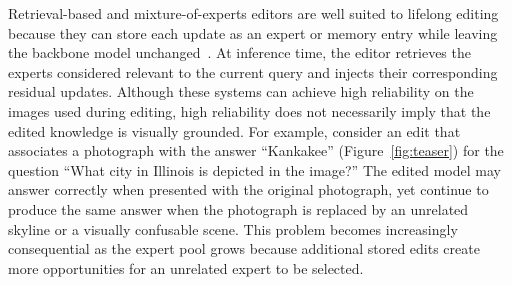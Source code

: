 \documentclass[letterpaper]{article} %
\begin{document}

Retrieval-based and mixture-of-experts editors are well suited to lifelong editing because they can store each update as an expert or memory entry while leaving the backbone model unchanged~\citep{mitchell2022serac,chen2025liveedit}. At inference time, the editor retrieves the experts considered relevant to the current query and injects their corresponding residual updates. Although these systems can achieve high reliability on the images used during editing, high reliability does not necessarily imply that the edited knowledge is visually grounded. For example, consider an edit that associates a photograph with the answer ``Kankakee'' (Figure~\ref{fig:teaser}) for the question ``What city in Illinois is depicted in the image?'' The edited model may answer correctly when presented with the original photograph, yet continue to produce the same answer when the photograph is replaced by an unrelated skyline or a visually confusable scene. This problem becomes increasingly consequential as the expert pool grows because additional stored edits create more opportunities for an unrelated expert to be selected.


\end{document}
